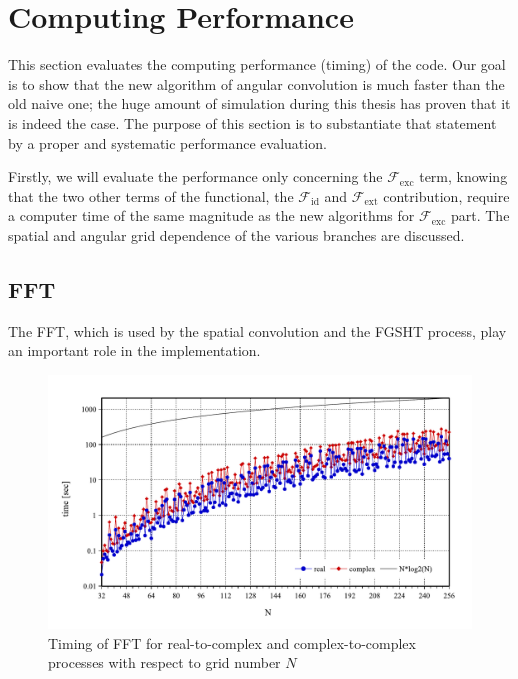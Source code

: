 
\chapter{Computing Performance \label{chpt:seq-code-performance}}

This section evaluates the computing performance (timing) of the code.
Our goal is to show that the new algorithm of angular convolution
is much faster than the old naive one; the huge amount of simulation
during this thesis has proven that it is indeed the case. The purpose
of this section is to substantiate that statement by a proper and
systematic performance evaluation.

Firstly, we will evaluate the performance only concerning
the $\mathcal{F}_{\mathrm{exc}}$ term, knowing that the two other
terms of the functional, the $\mathcal{F}_{\mathrm{id}}$ and $\mathcal{F}_{\mathrm{ext}}$
contribution, require a computer time of the same magnitude as the
new algorithms for $\mathcal{F}_{\mathrm{exc}}$ part. The spatial
and angular grid dependence of the various branches are discussed.

\section{FFT}

The \acs{FFT}, which is used by the spatial convolution and the \acs{FGSHT}
process, play an important role in the implementation. 

\begin{figure}[H]
\begin{centering}
\includegraphics[bb=0bp 20bp 567bp 310bp,width=1\columnwidth]{_figure/results/fftw_timing}
\par\end{centering}
\caption{Timing of \acs{FFT} for real-to-complex and complex-to-complex processes
with respect to grid number $N$\label{fig:timing-FFT}}
\end{figure}


